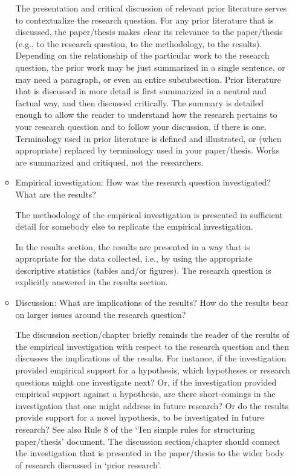 \documentclass[11pt,fleqn,a4paper/thesis]{article}
\newcommand{\6}{\mbox{$[\hspace*{-.6mm}[$}}
\newcommand{\9}{\mbox{$]\hspace*{-.6mm}]$}}
\begin{document}
\begin{itemize}[itemsep=-1pt,leftmargin=2.5ex,topsep=-2pt]
\begin{itemize}[leftmargin=2.5ex,topsep=-2pt]
The presentation and critical discussion of relevant prior literature serves to contextualize the research question. For any prior literature that is discussed, the paper/thesis makes clear its relevance to the paper/thesis (e.g., to the research question, to the methodology, to the results). Depending on the relationship of the particular work to the research question, the prior work may be just summarized in a single sentence, or may need a paragraph, or even an entire subsubsection. Prior literature that is discussed in more detail is first summarized in a neutral and factual way, and then discussed critically. The summary is detailed enough to allow the reader to understand how the research pertains to your research question and to follow your discussion, if there is one. Terminology used in prior literature is defined and illustrated, or (when appropriate) replaced by terminology used in your paper/thesis. Works are summarized and critiqued, not the researchers.

\item Empirical investigation: How was the research question investigated? What are the results?

The methodology of the empirical investigation is presented in sufficient detail for somebody else to replicate the empirical investigation. 

In the results section, the results are presented in a way that is appropriate for the data collected, i.e., by using the appropriate descriptive statistics (tables and/or figures). The research question is explicitly answered in the results section.

\item Discussion: What are implications of the results? How do the results bear on larger issues around the research question?

The discussion section/chapter briefly reminds the reader of the results of the empirical investigation with respect to the research question and then discusses the implications of the results. For instance, if the investigation provided empirical support for a hypothesis, which hypotheses or research questions might one investigate next? Or, if the investigation provided empirical support against a hypothesis, are there short-comings in the investigation that one might address in future research? Or do the results provide support for a novel hypothesis, to be investigated in future research? See also Rule 8 of the `Ten simple rules for structuring paper/thesis' document. The discussion section/chapter should connect the investigation that is presented in the paper/thesis to the wider body of research discussed in `prior research'.


\end{itemize}
\end{itemize}
\end{document}
